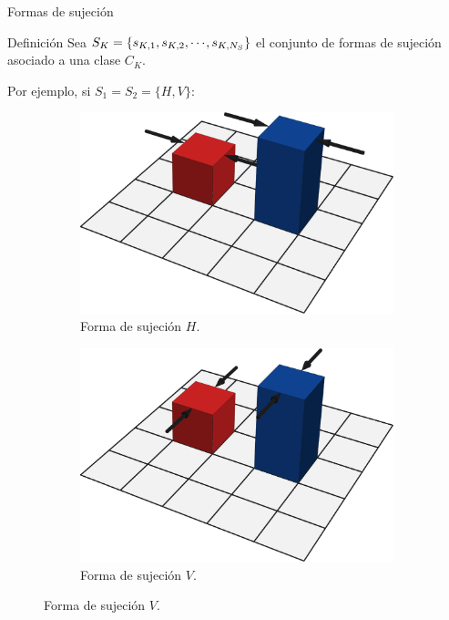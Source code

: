 \documentclass[14pt, aspectratio = 1610, xcolor=table, structureblod]{beamer}
\begin{document}
\begin{frame}{Formas de sujeción}
	\vspace{-1pt}%
	\begin{block}{Definición}
		Sea $S_K = \{s_{K, 1}, s_{K, 2}, \cdots\hspace{-1pt}, s_{K, N_S}\}$ el conjunto de formas de sujeción asociado a una clase $C_K$.
	\end{block}
	\vskip 3pt%
	Por ejemplo, si $S_1 = S_2 = \{H, V\}$:
	\vskip 3pt%
	\begin{figure}[H]
		\captionsetup[subfigure]{width=1.05\linewidth, skip=1pt}%
		\begin{subfigure}{4.5cm}
			\includegraphics[width=\linewidth]{agarre_horizontal}%
			\caption{Forma de sujeción $H$.}%
		\end{subfigure}%
		\hspace{1.75cm}%
		\begin{subfigure}{4.5cm}
			\includegraphics[width=\linewidth]{agarre_vertical}%
			\caption{Forma de sujeción $V$.}%
		\end{subfigure}
	\end{figure}
\end{frame}
\end{document}
